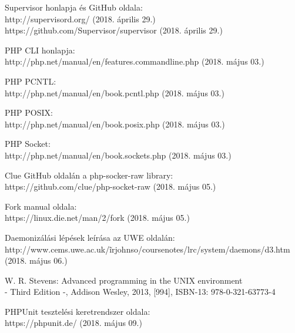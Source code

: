 \documentclass[12pt]{report}
\begin{document}
\begin{thebibliography}{20}

  Supervisor honlapja és GitHub oldala: \\
   \hspace*{3mm}http://supervisord.org/  (2018. április 29.)\\
  \hspace*{3mm}https://github.com/Supervisor/supervisor (2018. április 29.)

  PHP CLI honlapja: \\
   \hspace*{3mm}http://php.net/manual/en/features.commandline.php  (2018. május 03.)
   
   PHP PCNTL: \\
   \hspace*{3mm}http://php.net/manual/en/book.pcntl.php  (2018. május 03.)
   
   PHP POSIX: \\
   \hspace*{3mm}http://php.net/manual/en/book.posix.php  (2018. május 03.)
   
   PHP Socket: \\
   \hspace*{3mm}http://php.net/manual/en/book.sockets.php  (2018. május 03.)
   
	Clue GitHub oldalán a php-socker-raw library: \\
	\hspace*{3mm}https://github.com/clue/php-socket-raw  (2018. május 05.)
    
	Fork manual oldala: \\
	\hspace*{3mm} https://linux.die.net/man/2/fork  (2018. május 05.)
    
	Daemonizálási lépések leírása az UWE oldalán: \\
	\hspace*{3mm} http://www.cems.uwe.ac.uk/\~irjohnso/coursenotes/lrc/system/daemons/d3.htm  (2018. május 06.)
    
	W. R. Stevens: Advanced programming in the UNIX environment \\
    - Third Edition -, Addison Wesley, 2013, [994], ISBN-13: 978-0-321-63773-4 
    
	PHPUnit tesztelési keretrendszer oldala: \\
	\hspace*{3mm}https://phpunit.de/  (2018. május 09.)
    
\end{thebibliography}
\end{document}
